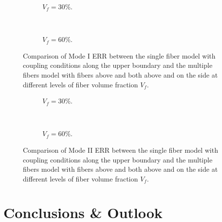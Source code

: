 \documentclass[review]{elsarticle}
\begin{document}
\begin{figure}[!h]
\centering
    \begin{subfigure}[b]{0.45\textwidth}
        \caption{$V_{f}=30\%$.}\label{subfig:comparisoncoupling30MI}
    \end{subfigure} ~
    \begin{subfigure}[b]{0.45\textwidth}
        \caption{$V_{f}=60\%$.}\label{subfig:comparisoncoupling60MI}
    \end{subfigure}

\caption{Comparison of Mode I ERR between the single fiber model with coupling conditions along the upper boundary and the multiple fibers model with fibers above and both above and on the side at different levels of fiber volume fraction $V_{f}$.}\label{fig:comparisoncouplingMI}
\end{figure}

\begin{figure}[!h]
\centering
    \begin{subfigure}[b]{0.45\textwidth}
        \caption{$V_{f}=30\%$.}\label{subfig:comparisoncoupling30MII}
    \end{subfigure} ~
    \begin{subfigure}[b]{0.45\textwidth}
        \caption{$V_{f}=60\%$.}\label{subfig:comparisoncoupling60MII}
    \end{subfigure}

\caption{Comparison of Mode II ERR between the single fiber model with coupling conditions along the upper boundary and the multiple fibers model with fibers above and both above and on the side at different levels of fiber volume fraction $V_{f}$.}\label{fig:comparisoncouplingMII}
\end{figure}

\section{Conclusions \& Outlook}
\end{document}

